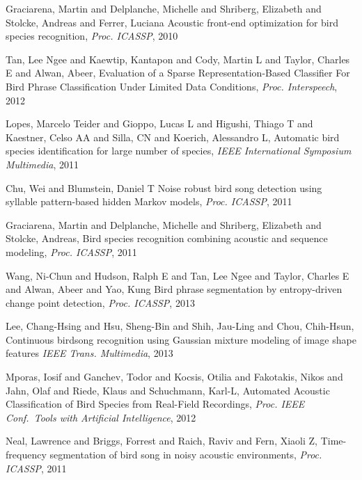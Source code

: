 \documentclass{article}
\begin{document}
\begin{thebibliography}{100}
Graciarena, Martin and Delplanche, Michelle and Shriberg, Elizabeth and Stolcke, Andreas and Ferrer, Luciana
Acoustic front-end optimization for bird species recognition,
\emph{Proc. ICASSP}, 2010

Tan, Lee Ngee and Kaewtip, Kantapon and Cody, Martin L and Taylor, Charles E and
Alwan, Abeer,
Evaluation of a Sparse Representation-Based Classifier For Bird Phrase
Classification Under Limited Data Conditions,
\emph{Proc. Interspeech}, 2012

Lopes, Marcelo Teider and Gioppo, Lucas L and Higushi, Thiago T and Kaestner,
Celso AA and Silla, CN and Koerich, Alessandro L,
Automatic bird species identification for large number of species,
\emph{IEEE International Symposium Multimedia}, 2011

Chu, Wei and Blumstein, Daniel T
Noise robust bird song detection using syllable pattern-based hidden {M}arkov
models,
\emph{Proc. ICASSP}, 2011

Graciarena, Martin and Delplanche, Michelle and Shriberg, Elizabeth and Stolcke,
Andreas,
Bird species recognition combining acoustic and sequence modeling,
\emph{Proc. ICASSP}, 2011

Wang, Ni-Chun and Hudson, Ralph E and Tan, Lee Ngee and Taylor, Charles E and Alwan, Abeer and Yao, Kung
Bird phrase segmentation by entropy-driven change point detection,
\emph{Proc. ICASSP}, 2013

Lee, Chang-Hsing and Hsu, Sheng-Bin and Shih, Jau-Ling and Chou, Chih-Hsun,
Continuous birdsong recognition using Gaussian mixture modeling of image shape features
\emph{IEEE Trans. Multimedia}, 2013

Mporas, Iosif and Ganchev, Todor and Kocsis, Otilia and Fakotakis, Nikos and
Jahn, Olaf and Riede, Klaus and Schuchmann, Karl-L,
Automated Acoustic Classification of Bird Species from Real-Field Recordings,
\emph{Proc. IEEE Conf.~Tools with Artificial Intelligence}, 2012

Neal, Lawrence and Briggs, Forrest and Raich, Raviv and Fern, Xiaoli Z,
Time-frequency segmentation of bird song in noisy acoustic environments,
\emph{Proc. ICASSP}, 2011






















\end{thebibliography}
    
\end{document}
